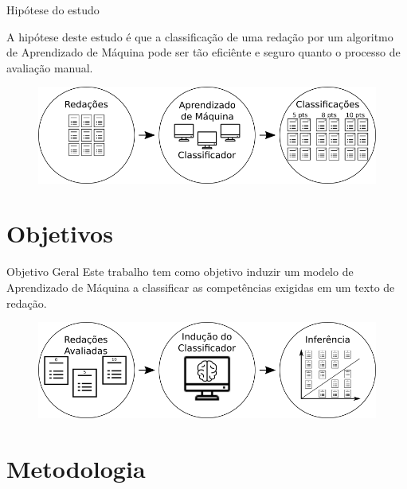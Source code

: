 \documentclass[10pt]{beamer}
\begin{document}
\begin{frame}[fragile]{Hipótese do estudo}

A hipótese deste estudo é que a classificação de uma redação por um algoritmo de Aprendizado de Máquina pode ser tão eficiênte e seguro quanto o processo de avaliação manual.

\begin{figure}[H]
\begin{center}
    \includegraphics[scale=0.52]{images/automatic_essay_system.png}
\end{center}
\end{figure}

\end{frame}

\section{Objetivos}

\begin{frame}[fragile]{Objetivo Geral}
Este trabalho tem como objetivo induzir um modelo de Aprendizado de Máquina a classificar as competências exigidas em um texto de redação.

\begin{figure}[H]
\begin{center}
    \includegraphics[scale=0.52]{images/induction_inference.png}
\end{center}
\end{figure}
\end{frame}

\section{Metodologia}
\end{document}
